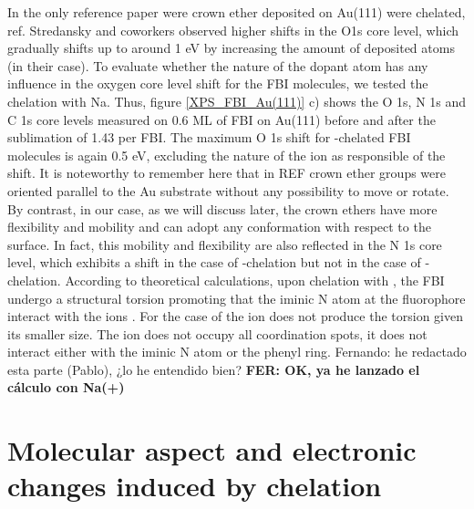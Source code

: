 \documentclass[aps,prl,reprint,longbibliography,superscriptaddress, english]{revtex4-1}
\newcommand{\completar}[1]{{\color{red} #1}}
\begin{document}
In the only reference paper were crown ether deposited on Au(111) were chelated, ref. \cite{stredansky_-surface_2019} Stredansky and coworkers observed higher shifts in the O1s core level, which gradually shifts up to around 1 eV by increasing the amount of deposited atoms (\Nap in their case). 
To evaluate whether the nature of the dopant atom has any influence in the oxygen core level shift for the FBI molecules, we tested the chelation with Na. Thus, figure \ref{XPS_FBI_Au(111)} c) shows the O 1s, N 1s and C 1s core levels measured on 0.6 ML of FBI on Au(111) before and after the sublimation of 1.43 \Nap per FBI. The maximum O 1s shift for \Nap-chelated FBI molecules is again 0.5 eV, excluding the nature of the ion as responsible of the shift.
It is noteworthy to remember here that in REF \cite{stredansky_-surface_2019} crown ether groups were oriented parallel to the Au substrate without any possibility to move or rotate. By contrast, in our case, as we will discuss later, the crown ethers have more flexibility and mobility and can adopt any conformation with respect to the surface. In fact, this mobility and flexibility are also reflected in the N 1s core level, which exhibits a shift in the case of \Bapp-chelation but not in the case of \Nap-chelation.
According to theoretical calculations, upon chelation with \Bapp, the FBI undergo a structural torsion promoting that the iminic N atom at the fluorophore interact with the ions \cite{rivilla_fluorescent_2020}.  For the case of \Nap the ion does not produce the torsion given its smaller size. The \Nap ion does not  occupy all coordination spots, it does not interact either with the iminic N atom or the phenyl ring. \completar{Fernando: he redactado esta parte (Pablo), ¿lo he entendido bien? \textbf{FER: OK, ya he lanzado el cálculo con Na(+)}}



\section{Molecular aspect and electronic changes induced by chelation}
\end{document}
